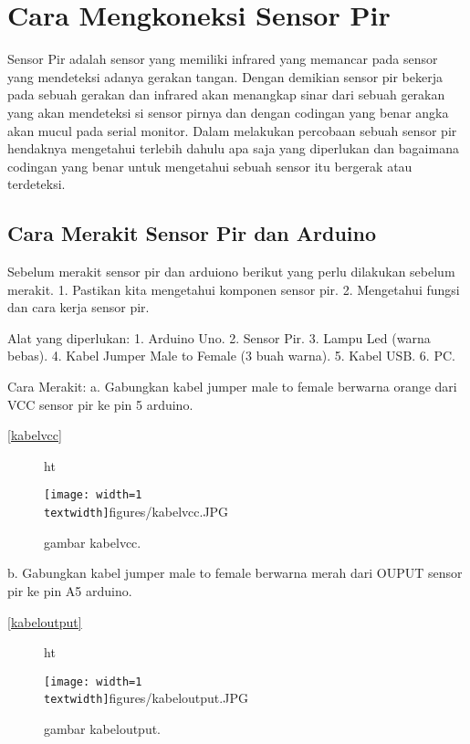 
\section {Cara Mengkoneksi Sensor Pir}

Sensor Pir adalah sensor yang memiliki infrared yang memancar pada sensor yang mendeteksi adanya gerakan tangan.
Dengan demikian sensor pir bekerja pada sebuah gerakan dan infrared akan menangkap sinar dari sebuah gerakan yang akan mendeteksi si sensor pirnya dan dengan codingan yang benar angka akan mucul pada serial monitor.
Dalam melakukan percobaan sebuah sensor pir hendaknya mengetahui terlebih dahulu apa saja yang diperlukan dan bagaimana codingan yang benar untuk mengetahui sebuah sensor itu bergerak atau terdeteksi. 

\subsection {Cara Merakit Sensor Pir dan Arduino}

Sebelum merakit sensor pir dan arduiono berikut yang perlu dilakukan sebelum merakit.
1. Pastikan kita mengetahui komponen sensor pir.
2. Mengetahui fungsi dan cara kerja sensor pir.

Alat yang diperlukan:
1. Arduino Uno.
2. Sensor Pir.
3. Lampu Led (warna bebas).
4. Kabel Jumper Male to Female (3 buah warna).
5. Kabel USB.
6. PC.

Cara Merakit:
a. Gabungkan kabel jumper male to female berwarna orange dari VCC sensor pir ke pin 5 arduino.

\ref{kabelvcc}

\begin{figure} {ht}
\centerline{\texttt{[image: width=1\\textwidth]}{figures/kabelvcc.JPG}}
\caption{gambar kabelvcc.}
\label{kabelvcc.JPG}
\end{figure}

b. Gabungkan kabel jumper male to female berwarna merah dari OUPUT sensor pir ke pin A5 arduino.

\ref{kabeloutput}

\begin{figure} {ht}
\centerline{\texttt{[image: width=1\\textwidth]}{figures/kabeloutput.JPG}}
\caption{gambar kabeloutput.}
\label{kabeloutput.JPG}
\end{figure}

